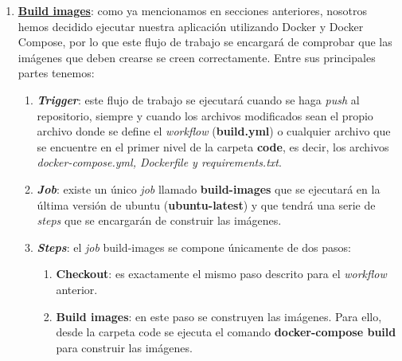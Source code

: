 \begin{enumerate}
        \item \textbf{\href{https://github.com/alexespana/TFG/actions/workflows/build.yml}
        {Build images}}: como ya mencionamos en secciones anteriores, nosotros hemos decidido
        ejecutar nuestra aplicación utilizando Docker y Docker Compose, por lo que este flujo
        de trabajo se encargará de comprobar que las imágenes que deben crearse se creen
        correctamente. Entre sus principales partes tenemos:
            \begin{enumerate}
                \item \textbf{\textit{Trigger}}: este flujo de trabajo se ejecutará cuando
                se haga \textit{push} al repositorio, siempre y cuando los archivos
                modificados sean el propio archivo donde se define el \textit{workflow}
                (\textbf{build.yml}) o cualquier archivo que se encuentre en el primer nivel
                de la carpeta \textbf{code}, es decir, los archivos
                \textit{docker-compose.yml, Dockerfile y requirements.txt}.
                \item \textbf{\textit{Job}}: existe un único \textit{job} llamado
                \textbf{build-images} que se ejecutará en la última versión de ubuntu
                (\textbf{ubuntu-latest}) y que tendrá una serie de \textit{steps} que se
                encargarán de construir las imágenes.
                \item \textbf{\textit{Steps}}: el \textit{job} build-images se compone
                únicamente de dos pasos:
                    \begin{enumerate}
                        \item \textbf{Checkout}: es exactamente el mismo paso descrito para
                        el \textit{workflow} anterior.
                        \item \textbf{Build images}: en este paso se construyen las
                        imágenes. Para ello, desde la carpeta code se ejecuta el comando
                        \textbf{docker-compose build} para construir las imágenes.
                    \end{enumerate}
            \end{enumerate}


\end{enumerate}
